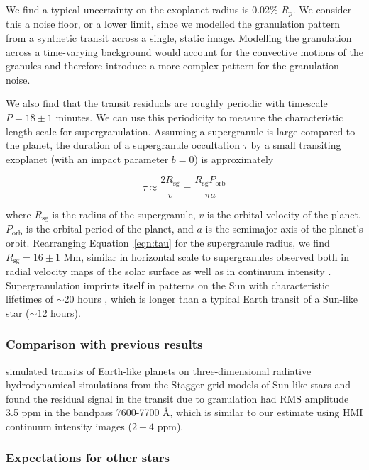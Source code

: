 We find a typical uncertainty on the exoplanet radius is 0.02\% $R_p$. We consider this a noise floor, or a lower limit, since we modelled the granulation pattern from a synthetic transit across a single, static image. Modelling the granulation across a time-varying background would account for the convective motions of the granules and therefore introduce a more complex pattern for the granulation noise.

We also find that the transit residuals are roughly periodic with timescale $P = 18 \pm 1$ minutes. We can use this periodicity to measure the characteristic length scale for supergranulation. Assuming a supergranule is large compared to the planet, the duration of a supergranule occultation $\tau$ by a small transiting exoplanet (with an impact parameter $b=0$) is approximately

\begin{equation}
\tau \approx \frac{2R_\mathrm{sg}}{v} = \frac{R_\mathrm{sg} P_\textrm{orb}}{\pi a} \label{eqn:tau}
\end{equation}

where $R_\mathrm{sg}$ is the radius of the supergranule, $v$ is the orbital velocity of the planet, $P_\textrm{orb}$ is the orbital period of the planet, and $a$ is the semimajor axis of the planet's orbit. Rearranging Equation~\ref{eqn:tau} for the supergranule radius, we find $R_\mathrm{sg} = 16 \pm 1$ Mm, similar in horizontal scale to supergranules observed both in radial velocity maps of the solar surface \citep{Hathaway2000} as well as in continuum intensity \citep[see for example][]{Meunier2008, Goldbaum2009, Rieutord2010}. Supergranulation imprints itself in patterns on the Sun with characteristic lifetimes of $\sim 20$ hours \citep{Rast2003}, which is longer than a typical Earth transit of a Sun-like star ($\sim 12$ hours).

\subsubsection{Comparison with previous results}

\citet{Chiavassa2017} simulated transits of Earth-like planets on three-dimensional radiative hydrodynamical simulations from the {\sc Stagger} grid models of Sun-like stars and found the residual signal in the transit due to granulation had RMS amplitude 3.5 ppm in the bandpass 7600-7700 \AA, which is similar to our estimate using HMI continuum intensity images ($2-4$ ppm).

\subsubsection{Expectations for other stars}

